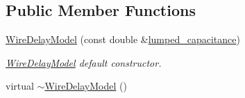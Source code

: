 \subsection*{Public Member Functions}
\begin{DoxyCompactItemize}
\item 
\hyperlink{classWireDelayModel_a0fd2defb581f6d8bcd67e5c935387d95}{Wire\-Delay\-Model} (const double \&\hyperlink{classWireDelayModel_a05f509843dfa07e17c9b6cc16ba9aaa0}{lumped\-\_\-capacitance})
\begin{DoxyCompactList}\small\item\em \hyperlink{classWireDelayModel}{Wire\-Delay\-Model} default constructor. \end{DoxyCompactList}\item 
\hypertarget{classWireDelayModel_ad9103d46909b96ad4015c818dcd2988c}{virtual \hyperlink{classWireDelayModel_ad9103d46909b96ad4015c818dcd2988c}{$\sim$\-Wire\-Delay\-Model} ()}\label{classWireDelayModel_ad9103d46909b96ad4015c818dcd2988c}


\end{DoxyCompactItemize}
